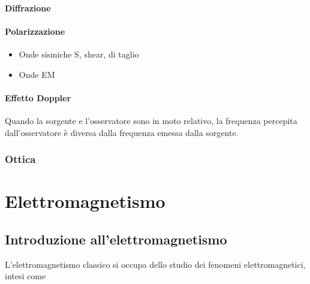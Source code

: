 \documentclass[letterpaper,10pt,italian]{jupyterBook}
\begin{document}
\subsection{Diffrazione}
\label{\detokenize{ch/waves/intro:diffrazione}}\label{\detokenize{ch/waves/intro:physics-hs-waves-effects-diffraction}}

\subsection{Polarizzazione}
\label{\detokenize{ch/waves/intro:polarizzazione}}\label{\detokenize{ch/waves/intro:physics-hs-waves-effects-polarization}}\begin{itemize}
\item {} 
\sphinxAtStartPar
Onde sismiche S, shear, di taglio

\item {} 
\sphinxAtStartPar
Onde EM

\end{itemize}


\subsection{Effetto Doppler}
\label{\detokenize{ch/waves/intro:effetto-doppler}}\label{\detokenize{ch/waves/intro:physics-hs-waves-effects-doppler}}
\sphinxAtStartPar
Quando la sorgente e l’osservatore sono in moto relativo, la frequenza percepita dall’osservatore è diversa dalla frequenza emessa dalla sorgente.


\section{Ottica}
\label{\detokenize{ch/waves/intro:ottica}}\label{\detokenize{ch/waves/intro:physics-hs-waves-optics}}
\sphinxstepscope


\part{Elettromagnetismo}

\sphinxstepscope


\chapter{Introduzione all’elettromagnetismo}
\label{\detokenize{ch/electromagnetism/intro:introduzione-all-elettromagnetismo}}\label{\detokenize{ch/electromagnetism/intro:physics-hs-electromagnetism-intro}}\label{\detokenize{ch/electromagnetism/intro::doc}}
\sphinxAtStartPar
L’elettromagnetismo classico si occupa dello studio dei fenomeni elettromagnetici, intesi come
\end{document}
